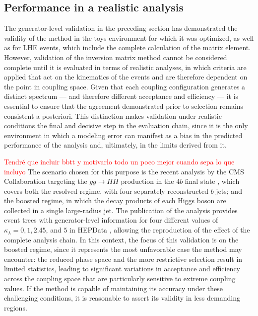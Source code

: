 \subsection{Performance in a realistic analysis}
\label{subsec:realistic}
The generator-level validation in the preceding section has demonstrated the validity of the method in the toys environment for which it was optimized, as well as for LHE events, which include the complete calculation of the matrix element. However, validation of the inversion matrix method cannot be considered complete until it is evaluated in terms of realistic analyses, in which criteria are applied that act on the kinematics of the events and are therefore dependent on the point in coupling space. Given that each coupling configuration generates a distinct spectrum — and therefore different acceptance and efficiency — it is essential to ensure that the agreement demonstrated prior to selection remains consistent a posteriori. This distinction makes validation under realistic conditions the final and decisive step in the evaluation chain, since it is the only environment in which a modeling error can manifest as a bias in the predicted performance of the analysis and, ultimately, in the limits derived from it.

\textcolor{red}{Tendré que incluir bbtt y motivarlo todo un poco mejor cuando sepa lo que incluyo} The scenario chosen for this purpose is the recent analysis by the CMS Collaboration targeting the $gg\to HH$ production in the $4b$ final state \cite{CMS:2026znu}, which covers both the resolved regime, with four separately reconstructed $b$ jets; and the boosted regime, in which the decay products of each Higgs boson are collected in a single large-radius jet. The publication of the analysis provides event trees with generator-level information for four different values of $\kappa_\lambda = 0, 1, 2.45$, and $5$ in HEPData \cite{hepdata.171917}, allowing the reproduction of the effect of the complete analysis chain. In this context, the focus of this validation is on the boosted regime, since it represents the most unfavorable case the method may encounter: the reduced phase space and the more restrictive selection result in limited statistics, leading to significant variations in acceptance and efficiency across the coupling space that are particularly sensitive to extreme coupling values. If the method is capable of maintaining its accuracy under these challenging conditions, it is reasonable to assert its validity in less demanding regions.\medskip

